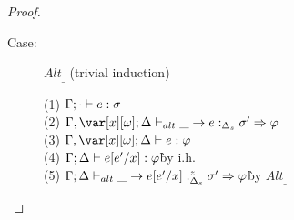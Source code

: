 \begin{proof}
\begin{description}
\item[Case:] $Alt_\_$ (trivial induction)
\begin{tabbing}
    (1) $\Gamma;\cdot \vdash e : \sigma$\\
    (2) $\G,\xo;\D \vdash_{alt} \_ \to e :_{\D_s} \s' \Rightarrow \vp$\\
    (3) $\G,\xo;\D \vdash e : \vp$\\
    (4) $\Gamma;\Delta \vdash e[e'/x] : \varphi$\` by i.h.\\
    (5) $\Gamma;\Delta \vdash_{alt} \_ \to e[e'/x] :^z_{\Delta_s} \sigma' \Rightarrow \varphi$\` by $Alt_\_$\\
\end{tabbing}

\end{description}
\end{proof}
